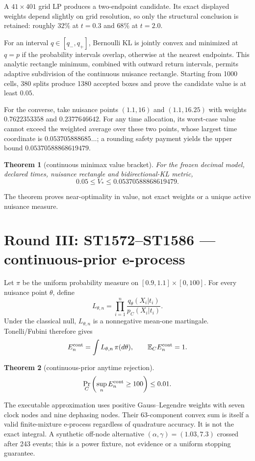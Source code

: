 \documentclass[11pt,a4paper]{article}
\newtheorem{theorem}{Theorem}\newcommand{\status}[1]{\textsf{[#1]}}
\begin{document}
A $41\times401$ grid LP produces a two-endpoint candidate.  Its exact displayed
weights depend slightly on grid resolution, so only the structural conclusion
is retained: roughly $32\%$ at $t=0.3$ and $68\%$ at $t=2.0$.

For an interval $q\in[q_-,q_+]$, Bernoulli KL is jointly convex and minimized
at $q=p$ if the probability intervals overlap, otherwise at the nearest
endpoints.  This analytic rectangle minimum, combined with outward return
intervals, permits adaptive subdivision of the continuous nuisance rectangle.
Starting from 1000 cells, 380 splits produce 1380 accepted boxes and prove the
candidate value is at least $0.05$.

For the converse, take nuisance points $(1.1,16)$ and $(1.1,16.25)$ with weights
$0.7622353358$ and $0.2377646642$.  For any time allocation, its worst-case
value cannot exceed the weighted average over these two points, whose largest
time coordinate is $0.053705888685\ldots$; a rounding safety payment yields
the upper bound $0.05370588868619479$.

\begin{theorem}[continuous minimax value bracket]
For the frozen decimal model, declared times, nuisance rectangle and
bidirectional-KL metric,
\[
\boxed{0.05\le V_*\le0.05370588868619479.}
\]
\end{theorem}

The theorem proves near-optimality in value, not exact weights or a unique
active nuisance measure.

\section{Round III: ST1572--ST1586 --- continuous-prior e-process}

Let $\pi$ be the uniform probability measure on
$[0.9,1.1]\times[0,100]$.  For every nuisance point $\theta$, define
\[
L_{\theta,n}=\prod_{i=1}^n
\frac{q_\theta(X_i|t_i)}{p_C(X_i|t_i)}.
\]
Under the classical null, $L_{\theta,n}$ is a nonnegative mean-one martingale.
Tonelli/Fubini therefore gives
\[
E_n^{\rm cont}=\int L_{\theta,n}\,\pi(d\theta),
\qquad
\mathbb E_C E_n^{\rm cont}=1.
\]

\begin{theorem}[continuous-prior anytime rejection]
\[
\Pr_C\left(\sup_nE_n^{\rm cont}\ge100\right)\le0.01.
\]
\end{theorem}

The executable approximation uses positive Gauss--Legendre weights with seven
clock nodes and nine dephasing nodes.  Their 63-component convex sum is itself
a valid finite-mixture e-process regardless of quadrature accuracy.  It is not
the exact integral.  A synthetic off-node alternative
$(\alpha,\gamma)=(1.03,7.3)$ crossed after 243 events; this is a power fixture,
not evidence or a uniform stopping guarantee.
\end{document}
